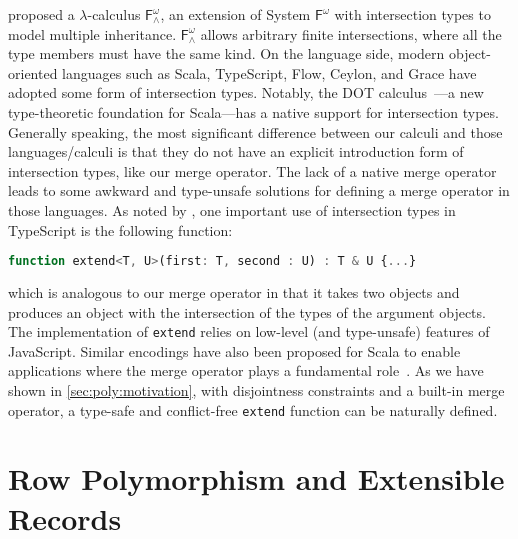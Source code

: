 \citet{compagnoni1996higher} proposed a $\lambda$-calculus
$\mathsf{F}_{\land}^{\omega}$, an extension of System $\mathsf{F}^{\omega}$ with
intersection types to model multiple inheritance. $\mathsf{F}_{\land}^{\omega}$
allows arbitrary finite intersections, where all the type members must have the
same kind. On the language side, modern object-oriented languages such as Scala, TypeScript,
Flow, Ceylon, and Grace have adopted some form of intersection types. Notably,
the DOT calculus~\citep{amin2012dependent,Rompf_2016}---a new type-theoretic
foundation for Scala---has a native support for intersection types. Generally
speaking, the most significant difference between our calculi and those
languages/calculi is that they do not have an explicit introduction form of
intersection types, like our merge operator. The lack of a native merge operator
leads to some awkward and type-unsafe solutions for defining a merge operator in
those languages. As noted by \citet{alpuimdisjoint}, one important use of
intersection types in TypeScript is the following function:
\begin{lstlisting}[language=JavaScript]
function extend<T, U>(first: T, second : U) : T & U {...}
\end{lstlisting}
which is analogous to our merge operator in that it takes two objects and
produces an object with the intersection of the types of the argument objects.
The implementation of \lstinline{extend} relies on low-level (and type-unsafe)
features of JavaScript. Similar encodings have also been proposed for Scala to
enable applications where the merge operator plays a fundamental
role~\citep{oliveira2013feature, rendel14attributes}. As we have shown in
\cref{sec:poly:motivation}, with disjointness constraints and a built-in merge
operator, a type-safe and conflict-free \lstinline{extend} function can be
naturally defined.



\section{Row Polymorphism and Extensible Records}
\label{sec:related:row}

